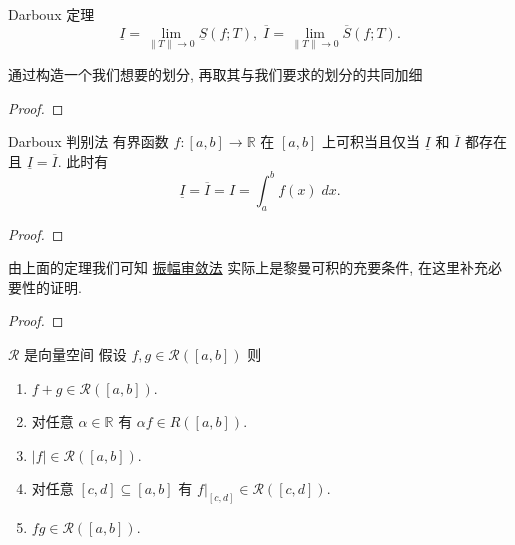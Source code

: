 \documentclass[cn,toc=twocol]{elegantbook}
\newcommand{\ITEMS}{\begin{enumerate}}
\newcommand{\ITEME}{\end{enumerate}}
\newcommand{\R}{\mathbb{R}}
\begin{document}
\begin{theorem}{Darboux 定理} %
	\[
		\underline{I} = \lim_{\lVert T \rVert \to 0} \underline{S} (f;T),\; \overline{I} = \lim_{\lVert T \rVert \to 0} \overline{S} (f;T).
	\]
\end{theorem}
\begin{idea*}
	通过构造一个我们想要的划分, 再取其与我们要求的划分的共同加细
\end{idea*}
\begin{proof}
	
\end{proof}

\begin{theorem}{Darboux 判别法}
	有界函数 $f : [a,b] \to \R$ 在 $[a,b]$ 上可积当且仅当 $\underline{I}$ 和 $\overline{I}$ 都存在且 $\underline{I} = \overline{I}$. 此时有
	\[
		\underline{I} = \overline{I} = I = \int_a^b f(x)\;dx.
	\]
\end{theorem}
\begin{proof}
\end{proof}


\vspace{1em}

由上面的定理我们可知 \hyperref[thm:darbouxct]{振幅审敛法} 实际上是黎曼可积的充要条件, 在这里补充必要性的证明.
\begin{proof}
	
\end{proof}

\begin{theorem}{$\mathscr{R}$ 是向量空间}
	假设 $f,g \in \mathscr{R}([a,b])$ 则
	\ITEMS
		\item $f + g \in \mathscr{R}([a,b])$.
		\item 对任意 $\alpha \in \R$ 有 $\alpha f \in R([a,b])$.
		\item $\lvert f \rvert \in \mathscr{R}([a,b])$.
		\item 对任意 $[c,d] \subseteq [a,b]$ 有 $f|_{[c,d]} \in \mathscr{R}([c,d])$.
		\item $fg \in \mathscr{R}([a,b])$.
	\ITEME
\end{theorem}
\end{document}
